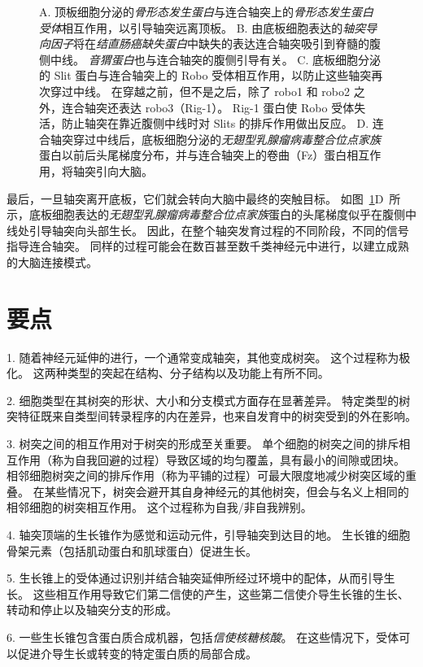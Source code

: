 \begin{figure}[htbp]
{		A. 顶板细胞分泌的\textit{骨形态发生蛋白}与连合轴突上的\textit{骨形态发生蛋白受体}相互作用，以引导轴突远离顶板。
		B. 由底板细胞表达的\textit{轴突导向因子}将在\textit{结直肠癌缺失蛋白}中缺失的表达连合轴突吸引到脊髓的腹侧中线。
		\textit{音猬蛋白}也与连合轴突的腹侧引导有关。
		C. 底板细胞分泌的 Slit 蛋白与连合轴突上的 Robo 受体相互作用，以防止这些轴突再次穿过中线。
		在穿越之前，但不是之后，除了 robo1 和 robo2 之外，连合轴突还表达 robo3（Rig-1）。
		Rig-1 蛋白使 Robo 受体失活，防止轴突在靠近腹侧中线时对 Slits 的排斥作用做出反应。
		D. 连合轴突穿过中线后，底板细胞分泌的\textit{无翅型乳腺瘤病毒整合位点家族}蛋白以前后头尾梯度分布，并与连合轴突上的卷曲（Fz）蛋白相互作用，将轴突引向大脑。}
	\label{fig:47_18}
\end{figure}


最后，一旦轴突离开底板，它们就会转向大脑中最终的突触目标。
如图~\ref{fig:47_18}D~所示，底板细胞表达的\textit{无翅型乳腺瘤病毒整合位点家族}蛋白的头尾梯度似乎在腹侧中线处引导轴突向头部生长。
因此，在整个轴突发育过程的不同阶段，不同的信号指导连合轴突。
同样的过程可能会在数百甚至数千类神经元中进行，以建立成熟的大脑连接模式。



\section{要点}

1. 随着神经元延伸的进行，一个通常变成轴突，其他变成树突。
这个过程称为极化。
这两种类型的突起在结构、分子结构以及功能上有所不同。


2. 细胞类型在其树突的形状、大小和分支模式方面存在显著差异。
特定类型的树突特征既来自类型间转录程序的内在差异，也来自发育中的树突受到的外在影响。


3. 树突之间的相互作用对于树突的形成至关重要。
单个细胞的树突之间的排斥相互作用（称为自我回避的过程）导致区域的均匀覆盖，具有最小的间隙或团块。
相邻细胞树突之间的排斥作用（称为平铺的过程）可最大限度地减少树突区域的重叠。
在某些情况下，树突会避开其自身神经元的其他树突，但会与名义上相同的相邻细胞的树突相互作用。
这个过程称为自我/非自我辨别。


4. 轴突顶端的生长锥作为感觉和运动元件，引导轴突到达目的地。
生长锥的细胞骨架元素（包括肌动蛋白和肌球蛋白）促进生长。


5. 生长锥上的受体通过识别并结合轴突延伸所经过环境中的配体，从而引导生长。
这些相互作用导致它们第二信使的产生，这些第二信使介导生长锥的生长、转动和停止以及轴突分支的形成。


6. 一些生长锥包含蛋白质合成机器，包括\textit{信使核糖核酸}。
在这些情况下，受体可以促进介导生长或转变的特定蛋白质的局部合成。


